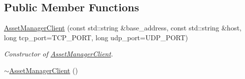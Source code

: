 \subsection*{Public Member Functions}
\begin{DoxyCompactItemize}
\item 
\hyperlink{classam_1_1_asset_manager_client_aef19f13fdc5939ddb53ec80f79f7dc1f}{AssetManagerClient} (const std::string \&base\_\-address, const std::string \&host, long tcp\_\-port=TCP\_\-PORT, long udp\_\-port=UDP\_\-PORT)
\begin{DoxyCompactList}\small\item\em Constructor of {\itshape \hyperlink{classam_1_1_asset_manager_client}{AssetManagerClient}\/}. \end{DoxyCompactList}\item 
\hypertarget{classam_1_1_asset_manager_client_af815a4a3a82b47ba39fa688819d5cb3d}{
\hyperlink{classam_1_1_asset_manager_client_af815a4a3a82b47ba39fa688819d5cb3d}{$\sim$AssetManagerClient} ()}
\label{classam_1_1_asset_manager_client_af815a4a3a82b47ba39fa688819d5cb3d}


\end{DoxyCompactItemize}
